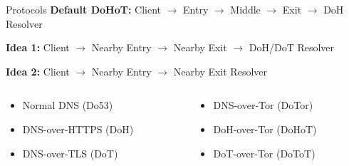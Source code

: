 \documentclass[xcolor=x11names,dvipsnames,aspectratio=169]{beamer}
\begin{document}
    \begin{frame}{Protocols}
        \textbf{Default DoHoT:}
        Client $\rightarrow$
        Entry $\rightarrow$
        Middle $\rightarrow$
        Exit $\rightarrow$
        DoH Resolver

        \pause
        \vspace{1em}
        \textbf{Idea 1:}
        Client $\rightarrow$
        Nearby Entry $\rightarrow$
        Nearby Exit $\rightarrow$
        DoH/DoT Resolver

        \pause
        \vspace{1em}
        \textbf{Idea 2:}
        Client $\rightarrow$
        Nearby Entry $\rightarrow$
        Nearby Exit Resolver

        \pause
        \vspace{2em}
        \begin{columns}
            \begin{column}{.5\textwidth}
                \begin{itemize}
                    \item Normal DNS (Do53)
                    \item DNS-over-HTTPS (DoH)
                    \item DNS-over-TLS (DoT)
                \end{itemize}
            \end{column}
            \pause
            \begin{column}{.5\textwidth}
                \begin{itemize}
                    \item DNS-over-Tor (DoTor)
                    \item DoH-over-Tor (DoHoT)
                    \item DoT-over-Tor (DoToT)
                \end{itemize}
            \end{column}
        \end{columns}
    \end{frame}
\end{document}
